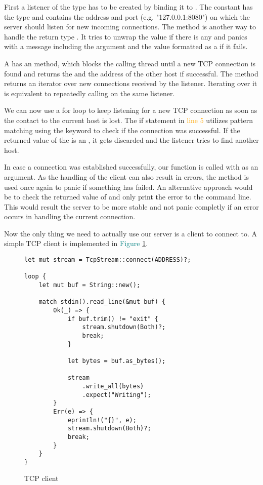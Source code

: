 First a listener of the type  has to be created by binding it to . The
constant  has the type  and contains the address and port (e.g. "127.0.0.1:8080") on which the
server should listen for new incoming connections. The method  is another way to handle the return type
. It tries to unwrap the  value if there is any and panics with a message including the argument
and the  value formatted as a  if it fails.

A  has an  method, which blocks the calling thread until a new TCP connection is found
and returns the  and the address of the other host if successful. The method  returns an
iterator over new connections received by the listener. Iterating over it is equivalent to repeatedly calling
 on the same listener.

We can now use a for loop to keep listening for a new TCP connection as soon as the contact to the current host is
lost. The if statement in \textcolor{orange}{line 5} utilizes pattern matching using the keyword  to check
if the connection was successful. If the returned value of the  is an , it gets discarded
and the listener tries to find another host.

In case a connection was established successfully, our function  is called with  as an
argument. As the handling of the client can also result in errors, the  method is used once again to
panic if something has failed. An alternative approach would be to check the returned value of  and
only print the error to the command line. This would result the server to be more stable and not panic completly if an
error occurs in handling the current connection.

Now the only thing we need to actually use our server is a client to connect to. A simple TCP client is implemented in
\textcolor{teal}{Figure \ref{tcp-client}}.

\begin{figure}[ht]
    \begin{verbatim}
let mut stream = TcpStream::connect(ADDRESS)?;

loop {
    let mut buf = String::new();

    match stdin().read_line(&mut buf) {
        Ok(_) => {
            if buf.trim() != "exit" {
                stream.shutdown(Both)?;
                break;
            }

            let bytes = buf.as_bytes();

            stream
                .write_all(bytes)
                .expect("Writing");
        }
        Err(e) => {
            eprintln!("{}", e);
            stream.shutdown(Both)?;
            break;
        }
    }
}
    \end{verbatim}
    \caption{TCP client}
    \label{tcp-client}
\end{figure}

